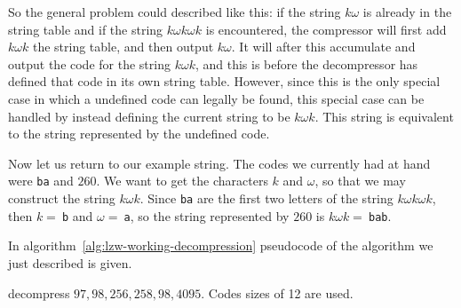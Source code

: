 \newcommand{\ko}{\ensuremath{k\omega}\xspace}
\newcommand{\kok}{\ensuremath{k\omega{}k}\xspace}
\newcommand{\kokok}{\ensuremath{k\omega{}k \omega{} k}\xspace}

So the general problem could described like this\cite{welch85:_u}: if
the string \ko is already in the string table and if the string \kokok
is encountered, the compressor will first add \kok the string table,
and then output \ko. It will after this accumulate and output the code
for the string \kok, and this is before the decompressor has defined
that code in its own string table. However, since this is the only
special case in which a undefined code can legally be found, this
special case can be handled by instead defining the current string to
be $\kok$. This string is equivalent to the string represented by the
undefined code.

Now let us return to our example string. The codes we currently had at
hand were \texttt{ba} and $260$. We want to get the characters $k$ and
$\omega$, so that we may construct the string $\kok$. Since
\texttt{ba} are the first two letters of the string $\kokok$, then $k
=\ $\texttt{b} and $\omega =\ $\texttt{a}, so the string represented
by $260$ is $\kok =\ $\texttt{bab}.

In algorithm~\ref{alg:lzw-working-decompression} pseudocode of the
algorithm we just described is given.

\begin{Exercise}[label={lzw-decompress}]

  \lzw decompress $97,98,256,258,98,4095$. Codes sizes of 12 are used.

\end{Exercise}



